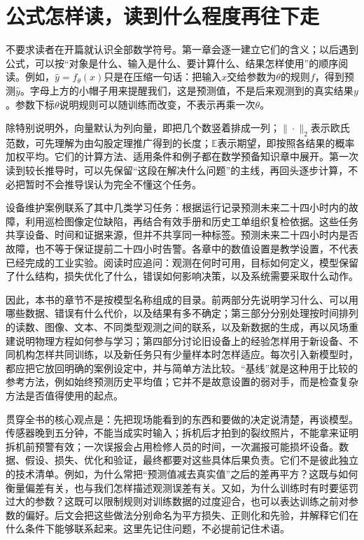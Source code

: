 ﻿\documentclass[a4paper,UTF8,zihao=-4,openany]{ctexbook}
\begin{document}
\section*{公式怎样读，读到什么程度再往下走}
不要求读者在开篇就认识全部数学符号。第一章会逐一建立它们的含义；以后遇到公式，可以按“对象是什么、输入是什么、要计算什么、结果怎样使用”的顺序阅读。例如，$\hat y=f_\theta(x)$只是在压缩一句话：把输入$x$交给参数为$\theta$的规则$f$，得到预测$\hat y$。字母上方的小帽子用来提醒我们，这是预测值，不是后来观测到的真实结果$y$。参数下标$\theta$说明规则可以随训练而改变，不表示再乘一次$\theta$。

除特别说明外，向量默认为列向量，即把几个数竖着排成一列；$\|\cdot\|_2$表示欧氏范数，可先理解为由勾股定理推广得到的长度；$\mathbb{E}$表示期望，即按照各结果的概率加权平均。它们的计算方法、适用条件和例子都在数学预备知识章中展开。第一次读到较长推导时，可以先保留“这段在解决什么问题”的主线，再回头逐步计算，不必把暂时不会推导误认为完全不懂这个任务。

设备维护案例联系了其中几类学习任务：根据运行记录预测未来二十四小时内的故障，利用巡检图像定位缺陷，再结合有效手册和历史工单组织复检依据。这些任务共享设备、时间和证据来源，但并不共享同一种标签。预测未来二十四小时内是否故障，也不等于保证提前二十四小时告警。各章中的数值设置是教学设置，不代表已经完成的工业实验。阅读时应追问：观测在何时可用，目标如何定义，模型保留了什么结构，损失优化了什么，错误如何影响决策，以及系统需要采取什么动作。

因此，本书的章节不是按模型名称组成的目录。前两部分先说明学习什么、可以用哪些数据、错误有什么代价，以及结果有多不确定；第三部分分别处理按时间排列的读数、图像、文本、不同类型观测之间的联系，以及新数据的生成，再以风场重建说明物理方程如何参与学习；第四部分讨论旧设备上的经验怎样用于新设备、不同机构怎样共同训练，以及新任务只有少量样本时怎样适应。每次引入新模型时，都应把它放回明确的案例设定中，并与简单方法比较。“基线”就是这种用于比较的参考方法，例如始终预测历史平均值；它并不是故意设置的弱对手，而是检查复杂方法是否值得使用的起点。

贯穿全书的核心观点是：先把现场能看到的东西和要做的决定说清楚，再谈模型。传感器晚到五分钟，不能当成实时输入；拆机后才拍到的裂纹照片，不能拿来证明拆机前预警有效；一次误报会占用检修人员的时间，一次漏报可能损坏设备。数据、假设、损失、优化和验证，最终都要对这些具体后果负责。它们不是彼此独立的技术清单。例如，为什么常把“预测值减去真实值”之后的差再平方？这既与如何衡量偏差有关，也与我们怎样描述观测误差有关。又如，为什么训练时有时要惩罚过大的参数？这既可以限制规则对训练数据的过度迎合，也可以表达训练之前对参数的偏好。后文会把这些做法分别命名为平方损失、正则化和先验，并解释它们在什么条件下能够联系起来。这里先记住问题，不必提前记住术语。
\end{document}
